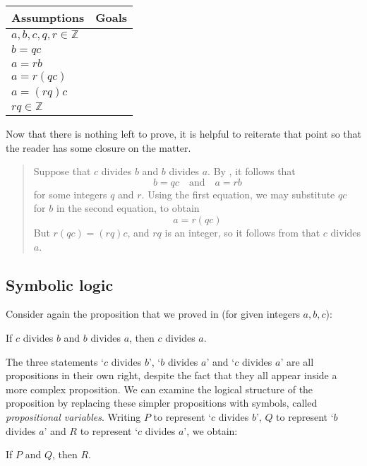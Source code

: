 \begin{example}
\begin{center}
\begin{tabular}{C{150pt}|C{150pt}}
\textbf{Assumptions} & \textbf{Goals} \\ \hline
$a,b,c,q,r \in \mathbb{Z}$ &  \\
$b=qc$ & \\
$a=rb$ & \\
$a=r(qc)$ & \\
$a=(rq)c$ & \\
$rq \in \mathbb{Z}$ & 
\end{tabular}
\end{center}

Now that there is nothing left to prove, it is helpful to reiterate that point so that the reader has some closure on the matter.

\begin{quote}
{\color{gray} Suppose that $c$ divides $b$ and $b$ divides $a$. By , it follows that
\[
b=qc \quad \text{and} \quad a=rb
\]
for some integers $q$ and $r$. Using the first equation, we may substitute $qc$ for $b$ in the second equation, to obtain
\[
a=r(qc)
\]
But $r(qc) = (rq)c$, and $rq$ is an integer,} so it follows from  that $c$ divides $a$.
\end{quote}
\end{example}

\subsection*{Symbolic logic}

Consider again the proposition that we proved in  (for given integers $a,b,c$):

\begin{center}
If $c$ divides $b$ and $b$ divides $a$, then $c$ divides $a$.
\end{center}

The three statements `$c$ divides $b$', `$b$ divides $a$' and `$c$ divides $a$' are all propositions in their own right, despite the fact that they all appear inside a more complex proposition. We can examine the logical structure of the proposition by replacing these simpler propositions with symbols, called \textit{propositional variables}. Writing $P$ to represent `$c$ divides $b$', $Q$ to represent `$b$ divides $a$' and $R$ to represent `$c$ divides $a$', we obtain:

\begin{center}
If $P$ and $Q$, then $R$.
\end{center}

